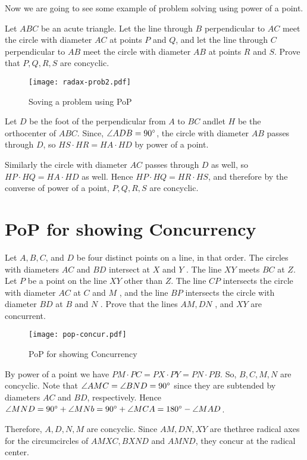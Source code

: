 Now we are going to see some example of problem solving using power of a point.

\begin{example}
Let $ABC$ be an acute triangle. Let the line through $B$ perpendicular to $AC$ meet the
circle with diameter $AC$ at points $P$ and $Q$, and let the line through $C$ perpendicular
to $AB$ meet the circle with diameter $AB$ at points $R$ and $S$. Prove that $P, Q, R, S$ are
concyclic.
\end{example}

\begin{figure}[ht]
\centering
	\texttt{[image: radax-prob2.pdf]}%
	\caption{Soving a problem using PoP}
\end{figure}


\begin{soln}
Let $D$ be the foot of the perpendicular from $A$ to $BC$ andlet $H$ be the orthocenter of $ABC$. Since, $\angle ADB =90^\circ$, the circle with diameter $AB$ passes through $D$, so $HS \cdot HR =
HA \cdot HD$ by power of a point. 

Similarly the circle with diameter $AC$ passes through $D$
as well, so $HP \cdot HQ = HA \cdot HD$ as well. Hence $HP \cdot HQ = HR \cdot HS$, and therefore by
the converse of power of a point, $P, Q, R, S$ are concyclic.
\end{soln}

\section{PoP for showing Concurrency}

\begin{example}[IMO 1995]
Let $A, B, C$, and $D$ be four distinct points on a line, in that order. The
circles with diameters $AC$ and $BD$ intersect at $X$ and $Y$ . The line $XY$ meets $BC$ at $Z$.
Let $P$ be a point on the line $XY$ other than $Z$. The line $CP$ intersects the circle with
diameter $AC$ at $C$ and $M$ , and the line $BP$ intersects the circle with diameter $BD$ at $B$
and $N$ . Prove that the lines $AM , DN$ , and $XY$ are concurrent.
\end{example}

\begin{figure}[ht]
\centering
	\texttt{[image: pop-concur.pdf]}%
	\caption{PoP for showing Concurrency}
\end{figure}

\begin{soln}
By power of a point we have \(PM \cdot PC= PX\cdot PY =PN \cdot PB \). So, \(B,C,M,N\) are concyclic. Note that $\angle AMC = \angle BND = 90^\circ$ since they are subtended by diameters $AC$ and $BD$, respectively. Hence $\angle MND = 90^\circ + \angle MNb = 90^\circ + \angle MCA = 180^\circ -\angle MAD $.

Therefore, $A,D,N,M$ are concyclic. Since $AM,DN,XY$ are thethree radical axes for the circumcircles of $AMXC,BXND$ and $AMND$, they concur at the radical center.

\end{soln}

